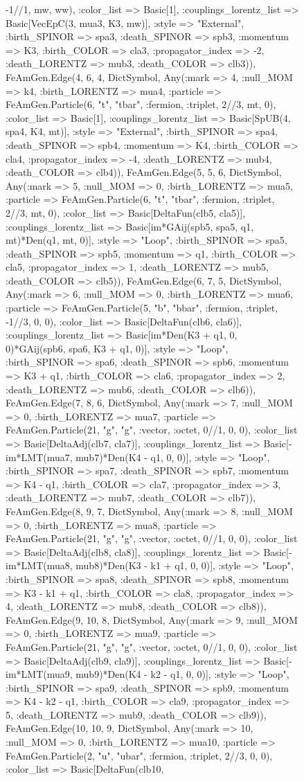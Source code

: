 \documentclass{revtex4}
\begin{document}
\begin{figure}[!htb]
\begin{center}
{-1//1, mw, ww), :color_list => Basic[1], :couplings_lorentz_list => Basic[VecEpC(3, mua3, K3, mw)], :style => "External", :birth_SPINOR => spa3, :death_SPINOR => spb3, :momentum => K3, :birth_COLOR => cla3, :propagator_index => -2, :death_LORENTZ => mub3, :death_COLOR => clb3)), FeAmGen.Edge(4, 6, 4, Dict{Symbol, Any}(:mark => 4, :null_MOM => k4, :birth_LORENTZ => mua4, :particle => FeAmGen.Particle(6, "t", "tbar", :fermion, :triplet, 2//3, mt, 0), :color_list => Basic[1], :couplings_lorentz_list => Basic[SpUB(4, spa4, K4, mt)], :style => "External", :birth_SPINOR => spa4, :death_SPINOR => spb4, :momentum => K4, :birth_COLOR => cla4, :propagator_index => -4, :death_LORENTZ => mub4, :death_COLOR => clb4)), FeAmGen.Edge(5, 5, 6, Dict{Symbol, Any}(:mark => 5, :null_MOM => 0, :birth_LORENTZ => mua5, :particle => FeAmGen.Particle(6, "t", "tbar", :fermion, :triplet, 2//3, mt, 0), :color_list => Basic[DeltaFun(clb5, cla5)], :couplings_lorentz_list => Basic[im*GAij(spb5, spa5, q1, mt)*Den(q1, mt, 0)], :style => "Loop", :birth_SPINOR => spa5, :death_SPINOR => spb5, :momentum => q1, :birth_COLOR => cla5, :propagator_index => 1, :death_LORENTZ => mub5, :death_COLOR => clb5)), FeAmGen.Edge(6, 7, 5, Dict{Symbol, Any}(:mark => 6, :null_MOM => 0, :birth_LORENTZ => mua6, :particle => FeAmGen.Particle(5, "b", "bbar", :fermion, :triplet, -1//3, 0, 0), :color_list => Basic[DeltaFun(clb6, cla6)], :couplings_lorentz_list => Basic[im*Den(K3 + q1, 0, 0)*GAij(spb6, spa6, K3 + q1, 0)], :style => "Loop", :birth_SPINOR => spa6, :death_SPINOR => spb6, :momentum => K3 + q1, :birth_COLOR => cla6, :propagator_index => 2, :death_LORENTZ => mub6, :death_COLOR => clb6)), FeAmGen.Edge(7, 8, 6, Dict{Symbol, Any}(:mark => 7, :null_MOM => 0, :birth_LORENTZ => mua7, :particle => FeAmGen.Particle(21, "g", "g", :vector, :octet, 0//1, 0, 0), :color_list => Basic[DeltaAdj(clb7, cla7)], :couplings_lorentz_list => Basic[-im*LMT(mua7, mub7)*Den(K4 - q1, 0, 0)], :style => "Loop", :birth_SPINOR => spa7, :death_SPINOR => spb7, :momentum => K4 - q1, :birth_COLOR => cla7, :propagator_index => 3, :death_LORENTZ => mub7, :death_COLOR => clb7)), FeAmGen.Edge(8, 9, 7, Dict{Symbol, Any}(:mark => 8, :null_MOM => 0, :birth_LORENTZ => mua8, :particle => FeAmGen.Particle(21, "g", "g", :vector, :octet, 0//1, 0, 0), :color_list => Basic[DeltaAdj(clb8, cla8)], :couplings_lorentz_list => Basic[-im*LMT(mua8, mub8)*Den(K3 - k1 + q1, 0, 0)], :style => "Loop", :birth_SPINOR => spa8, :death_SPINOR => spb8, :momentum => K3 - k1 + q1, :birth_COLOR => cla8, :propagator_index => 4, :death_LORENTZ => mub8, :death_COLOR => clb8)), FeAmGen.Edge(9, 10, 8, Dict{Symbol, Any}(:mark => 9, :null_MOM => 0, :birth_LORENTZ => mua9, :particle => FeAmGen.Particle(21, "g", "g", :vector, :octet, 0//1, 0, 0), :color_list => Basic[DeltaAdj(clb9, cla9)], :couplings_lorentz_list => Basic[-im*LMT(mua9, mub9)*Den(K4 - k2 - q1, 0, 0)], :style => "Loop", :birth_SPINOR => spa9, :death_SPINOR => spb9, :momentum => K4 - k2 - q1, :birth_COLOR => cla9, :propagator_index => 5, :death_LORENTZ => mub9, :death_COLOR => clb9)), FeAmGen.Edge(10, 10, 9, Dict{Symbol, Any}(:mark => 10, :null_MOM => 0, :birth_LORENTZ => mua10, :particle => FeAmGen.Particle(2, "u", "ubar", :fermion, :triplet, 2//3, 0, 0), :color_list => Basic[DeltaFun(clb10, }
\end{center}
\end{figure}
\end{document}

